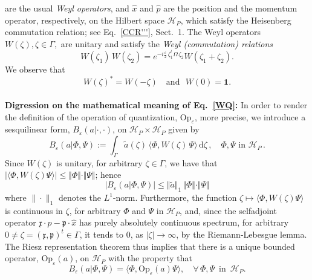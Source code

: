 \documentclass[11pt]{article}
\begin{document}
are the usual \textit{Weyl operators}, and $\hat{x}$ and $\hat{p}$ are the position and the momentum operator, respectively, on the Hilbert space $\mathcal{H}_P$, which satisfy the Heisenberg commutation relation; see Eq.~\eqref{CCR'''}, Sect.~1.
The Weyl operators $W(\zeta), \zeta\in \Gamma,$ are unitary and satisfy the 
\textit{Weyl (commutation) relations}
\begin{equation}\label{WR}
W(\zeta_1)\,W(\zeta_2) = e^{-i\frac{\varepsilon}{2}\,\zeta_{1}^{t} \Omega\,\zeta_2} W(\zeta_1 +\zeta_2).
\end{equation}
We observe that 
\begin{equation}\label{Wstar}
W(\zeta)^{*} = W(-\zeta) \quad \text{and }\,\, W(0)=\mathbf{1}.
\end{equation}
\\
\noindent
{\bf{Digression on the mathematical meaning of Eq.~\eqref{WQ}:}} In order to render the definition of the operation of quantization, $\text{Op}_{\varepsilon}$, 
more precise, we introduce a sesquilinear form, 
$B_{\varepsilon}(a |\cdot, \cdot)$, on $\mathcal{H}_P \times \mathcal{H}_P$ given by
\begin{equation}\label{sesqui}
B_{\varepsilon}(a | \Phi, \Psi):= \int_{\Gamma} \tilde{a}(\zeta) \,\langle \Phi, W(\zeta)\,\Psi \rangle\, \text{d}\zeta\,,
\quad \Phi, \Psi \text{ in } \mathcal{H}_P\,.
\end{equation}
Since $W(\zeta)$ is unitary, for arbitrary $\zeta \in \Gamma$, we have that 
$\vert \langle \Phi, W(\zeta) \Psi \rangle\vert  \leq \Vert \Phi\Vert\cdot \Vert \Psi \Vert$; hence 
\begin{equation}\label{eq:norm_ineq_B(a)}
\vert B_{\varepsilon}(a | \Phi, \Psi) \vert \leq \Vert \tilde{a} \Vert_{1} \, \Vert \Phi \Vert \cdot \Vert \Psi \Vert
\end{equation}
where $\|\cdot\|_1$ denotes the $L^1$-norm.
Furthermore, the function $\zeta \mapsto \langle \Phi, W(\zeta)\Psi \rangle$ is continuous in $\zeta$, for arbitrary $\Phi$ and 
$\Psi$ in $\mathcal{H}_P$, and, since the selfadjoint operator $\mathfrak{x}\cdot \hat{p}-\mathfrak{p}\cdot \hat{x}$
has purely absolutely continuous spectrum, for arbitrary $0\neq \zeta=(\mathfrak{x}, \mathfrak{p})^{t} \in \Gamma$, it tends 
to $0$, as $\vert \zeta \vert \rightarrow \infty$, by the Riemann-Lebesgue lemma. The Riesz representation theorem thus implies that there is a
 unique bounded operator, $\text{Op}_{\varepsilon}(a)$, on $\mathcal{H}_P$ with the property that
\begin{equation}\label{Op}
B_{\varepsilon}(a | \Phi, \Psi)= \langle \Phi, \text{Op}_{\varepsilon}(a)\Psi\rangle, \quad \forall \, \Phi, \Psi \,\text{ in } \,\mathcal{H}_P.
\end{equation}
\end{document}
